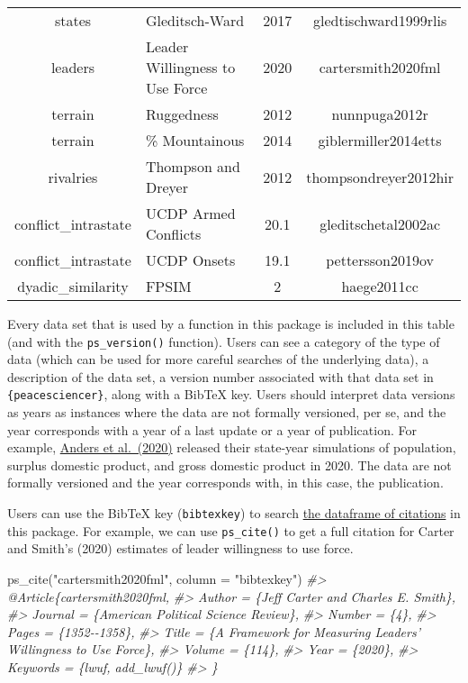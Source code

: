 \documentclass[
  11pt,
]{article}
\newenvironment{Shaded}{\begin{snugshade}}{\end{snugshade}}
\newcommand{\AttributeTok}[1]{\textcolor[rgb]{0.77,0.63,0.00}{#1}}
\newcommand{\CommentTok}[1]{\textcolor[rgb]{0.56,0.35,0.01}{\textit{#1}}}
\newcommand{\FunctionTok}[1]{\textcolor[rgb]{0.00,0.00,0.00}{#1}}
\newcommand{\NormalTok}[1]{#1}
\newcommand{\StringTok}[1]{\textcolor[rgb]{0.31,0.60,0.02}{#1}}
\begin{document}
\begin{longtable}[t]{clcc}
states & Gleditsch-Ward & 2017 & gledtischward1999rlis\\
leaders & Leader Willingness to Use Force & 2020 & cartersmith2020fml\\
\addlinespace
terrain & Ruggedness & 2012 & nunnpuga2012r\\
terrain & \% Mountainous & 2014 & giblermiller2014etts\\
rivalries & Thompson and Dreyer & 2012 & thompsondreyer2012hir\\
conflict\_intrastate & UCDP Armed Conflicts & 20.1 & gleditschetal2002ac\\
conflict\_intrastate & UCDP Onsets & 19.1 & pettersson2019ov\\
\addlinespace
dyadic\_similarity & FPSIM & 2 & haege2011cc\\
\bottomrule
\end{longtable}

Every data set that is used by a function in this package is included in this table (and with the \texttt{ps\_version()} function). Users can see a category of the type of data (which can be used for more careful searches of the underlying data), a description of the data set, a version number associated with that data set in \texttt{\{peacesciencer\}}, along with a BibTeX key. Users should interpret data versions as years as instances where the data are not formally versioned, per se, and the year corresponds with a year of a last update or a year of publication. For example, \href{https://doi.org/10.1093/isq/sqaa013}{Anders et al.~(2020)} released their state-year simulations of population, surplus domestic product, and gross domestic product in 2020. The data are not formally versioned and the year corresponds with, in this case, the publication.

Users can use the BibTeX key (\texttt{bibtexkey}) to search \href{http://svmiller.com/peacesciencer/reference/ps_bib.html}{the dataframe of citations} in this package. For example, we can use \texttt{ps\_cite()} to get a full citation for Carter and Smith's (2020) estimates of leader willingness to use force.

\begin{Shaded}
\begin{Highlighting}[]
\FunctionTok{ps\_cite}\NormalTok{(}\StringTok{"cartersmith2020fml"}\NormalTok{, }\AttributeTok{column =} \StringTok{"bibtexkey"}\NormalTok{)}
\CommentTok{\#\textgreater{} @Article\{cartersmith2020fml,}
\CommentTok{\#\textgreater{}   Author = \{Jeff Carter and Charles E. Smith\},}
\CommentTok{\#\textgreater{}   Journal = \{American Political Science Review\},}
\CommentTok{\#\textgreater{}   Number = \{4\},}
\CommentTok{\#\textgreater{}   Pages = \{1352{-}{-}1358\},}
\CommentTok{\#\textgreater{}   Title = \{A Framework for Measuring Leaders’ Willingness to Use Force\},}
\CommentTok{\#\textgreater{}   Volume = \{114\},}
\CommentTok{\#\textgreater{}   Year = \{2020\},}
\CommentTok{\#\textgreater{}   Keywords = \{lwuf, add\_lwuf()\}}
\CommentTok{\#\textgreater{} \}}
\end{Highlighting}
\end{Shaded}
\end{document}
